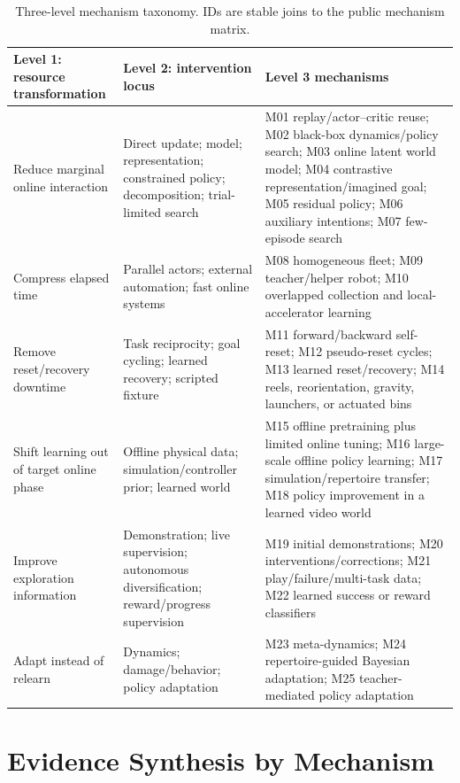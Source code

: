 \documentclass[11pt]{article}
\begin{document}
\begin{table}[t]
\centering
\small
\caption{Three-level mechanism taxonomy. IDs are stable joins to the public mechanism matrix.}
\label{tab:taxonomy}
\begin{tabularx}{\textwidth}{p{}p{}Y}
\toprule
Level 1: resource transformation & Level 2: intervention locus & Level 3 mechanisms \\
\midrule
Reduce marginal online interaction &
Direct update; model; representation; constrained policy; decomposition; trial-limited search &
M01 replay/actor--critic reuse; M02 black-box dynamics/policy search; M03 online latent world model; M04 contrastive representation/imagined goal; M05 residual policy; M06 auxiliary intentions; M07 few-episode search \\
\addlinespace
Compress elapsed time &
Parallel actors; external automation; fast online systems &
M08 homogeneous fleet; M09 teacher/helper robot; M10 overlapped collection and local-accelerator learning \\
\addlinespace
Remove reset/recovery downtime &
Task reciprocity; goal cycling; learned recovery; scripted fixture &
M11 forward/backward self-reset; M12 pseudo-reset cycles; M13 learned reset/recovery; M14 reels, reorientation, gravity, launchers, or actuated bins \\
\addlinespace
Shift learning out of target online phase &
Offline physical data; simulation/controller prior; learned world &
M15 offline pretraining plus limited online tuning; M16 large-scale offline policy learning; M17 simulation/repertoire transfer; M18 policy improvement in a learned video world \\
\addlinespace
Improve exploration information &
Demonstration; live supervision; autonomous diversification; reward/progress supervision &
M19 initial demonstrations; M20 interventions/corrections; M21 play/failure/multi-task data; M22 learned success or reward classifiers \\
\addlinespace
Adapt instead of relearn &
Dynamics; damage/behavior; policy adaptation &
M23 meta-dynamics; M24 repertoire-guided Bayesian adaptation; M25 teacher-mediated policy adaptation \\
\bottomrule
\end{tabularx}
\end{table}

\section{Evidence Synthesis by Mechanism}
\end{document}
